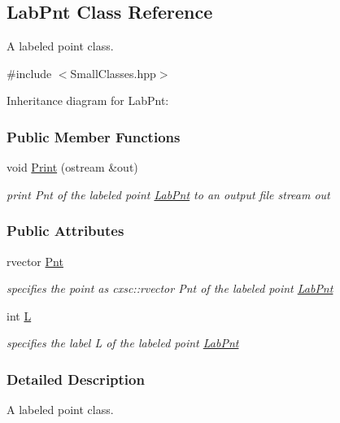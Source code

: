 \hypertarget{classLabPnt}{\subsection{\-Lab\-Pnt \-Class \-Reference}
\label{classLabPnt}
}


\-A labeled point class.  




{\ttfamily \#include $<$\-Small\-Classes.\-hpp$>$}



\-Inheritance diagram for \-Lab\-Pnt\-:
\subsubsection*{\-Public \-Member \-Functions}
\begin{DoxyCompactItemize}
\item 
void \hyperlink{classLabPnt_ac3062583331b0ca4591047cc79a0c3af}{\-Print} (ostream \&out)
\begin{DoxyCompactList}\small\item\em print \-Pnt of the labeled point \hyperlink{classLabPnt}{\-Lab\-Pnt} to an output file stream out \end{DoxyCompactList}\end{DoxyCompactItemize}
\subsubsection*{\-Public \-Attributes}
\begin{DoxyCompactItemize}
\item 
rvector \hyperlink{classLabPnt_a57c17e6672679825de3ba13b7486d276}{\-Pnt}
\begin{DoxyCompactList}\small\item\em specifies the point as cxsc\-::rvector \-Pnt of the labeled point \hyperlink{classLabPnt}{\-Lab\-Pnt} \end{DoxyCompactList}\item 
int \hyperlink{classLabPnt_ac63f9c6a9263427b84e7f576a122ae44}{\-L}
\begin{DoxyCompactList}\small\item\em specifies the label \-L of the labeled point \hyperlink{classLabPnt}{\-Lab\-Pnt} \end{DoxyCompactList}\end{DoxyCompactItemize}


\subsubsection{\-Detailed \-Description}
\-A labeled point class. 

